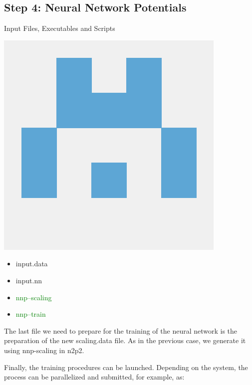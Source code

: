 \documentclass[12pt]{article}
\begin{document}
\subsection{Step 4: Neural Network Potentials}
\begin{mybox2}{{Input Files, Executables and Scripts}}
\begin{minipage}[c]{0.5\linewidth}
\includegraphics[scale=0.1]{latex_files/n2p2.png}
\end{minipage}
\begin{minipage}[c]{0.5\linewidth}
\begin{itemize}
  \item input.data
   \item input.nn
     \item \textcolor{green}{nnp--scaling}
   \item \textcolor{green}{nnp--train}
\end{itemize}
\end{minipage}
\end{mybox2}
The last file we need to prepare for the training of the neural network is the preparation of the new scaling.data file. As in the previous case, we generate it using nnp-scaling in n2p2.

Finally, the training procedures can be launched. Depending on the system, the process can be parallelized and submitted, for example, as:
\begin{center}
\end{center}
\end{document}
